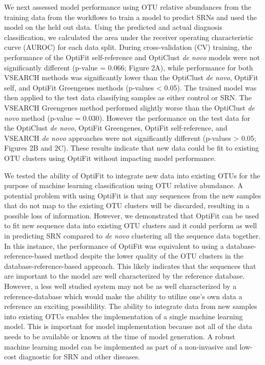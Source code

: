 \documentclass[
]{article}
\begin{document}
We next assessed model performance using OTU relative abundances from
the training data from the workflows to train a model to predict SRNs
and used the model on the held out data. Using the predicted and actual
diagnosis classification, we calculated the area under the receiver
operating characteristic curve (AUROC) for each data split. During
cross-validation (CV) training, the performance of the OptiFit
self-reference and OptiClust \emph{de novo} models were not
significantly different (p-value = 0.066; Figure 2A), while performance
for both VSEARCH methods was significantly lower than the OptiClust
\emph{de novo}, OptiFit self, and OptiFit Greengenes methods (p-values
\textless{} 0.05). The trained model was then applied to the test data
classifying samples as either control or SRN. The VSEARCH Greengenes
method performed slightly worse than the OptiClust \emph{de novo} method
(p-value = 0.030). However the performance on the test data for the
OptiClust \emph{de novo}, OptiFit Greengenes, OptiFit self-reference,
and VSEARCH \emph{de novo} approaches were not significantly different
(p-values \textgreater{} 0.05; Figures 2B and 2C). These results
indicate that new data could be fit to existing OTU clusters using
OptiFit without impacting model performance.

We tested the ability of OptiFit to integrate new data into existing
OTUs for the purpose of machine learning classification using OTU
relative abundance. A potential problem with using OptiFit is that any
sequences from the new samples that do not map to the existing OTU
clusters will be discarded, resulting in a possible loss of information.
However, we demonstrated that OptiFit can be used to fit new sequence
data into existing OTU clusters and it could perform as well in
predicting SRN compared to \emph{de novo} clustering all the sequence
data together. In this instance, the performance of OptiFit was
equivalent to using a database-reference-based method despite the lower
quality of the OTU clusters in the database-reference-based approach.
This likely indicates that the sequences that are important to the model
are well characterized by the reference database. However, a less well
studied system may not be as well characterized by a reference-database
which would make the ability to utilize one's own data a reference an
exciting possiblility. The ability to integrate data from new samples
into existing OTUs enables the implementation of a single machine
learning model. This is important for model implementation because not
all of the data needs to be available or known at the time of model
generation. A robust machine learning model can be implemented as part
of a non-invasive and low-cost diagnostic for SRN and other diseases.
\end{document}
